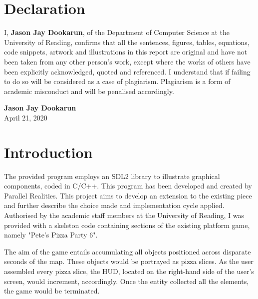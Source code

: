 \documentclass{article}
\begin{document}
\section*{Declaration}

I, \textbf{Jason Jay Dookarun}, of the Department of Computer Science at the University of Reading, confirms that all the sentences, figures, tables, equations, code snippets, artwork and illustrations in this report are original and have not been taken from any other person’s work, except where the works of others have been explicitly acknowledged, quoted and referenced. I understand that if failing to do so will be considered as a case of plagiarism. Plagiarism is a form of academic misconduct and will be penalised accordingly.

    \begin{flushright}
    \textbf{Jason Jay Dookarun} \\
    April 21, 2020\\
    [1cm]
    \end{flushright}

\tableofcontents
\thispagestyle{empty}

\listoffigures
{}
\cleardoublepage





\newpage
\section{Introduction}\label{sec:intro}
The provided program employs an SDL2 library to illustrate graphical components, coded in C/C++. This program has been developed and created by Parallel Realities. This project aims to develop an extension to the existing piece and further describe the choice made and implementation cycle applied. Authorised by the academic staff members at the University of Reading, I was provided with a skeleton code containing sections of the existing platform game, namely "Pete's Pizza Party 6".

The aim of the game entails accumulating all objects positioned across disparate seconds of the map. These objects would be portrayed as pizza slices. As the user assembled every pizza slice, the HUD, located on the right-hand side of the user's screen, would increment, accordingly. Once the entity collected all the elements, the game would be terminated.
\end{document}
